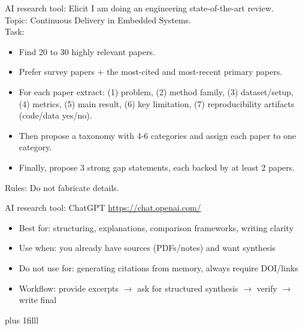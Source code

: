 \documentclass[aspectratio=169]{beamer}
\newcommand{\btVFill}{\vskip0pt plus 1filll}
\begin{document}
\begin{frame}{AI research tool: Elicit}
I am doing an engineering state-of-the-art review.\\
Topic: Continuous Delivery in Embedded Systems.\\
Task:
\begin{itemize}
 \item Find 20 to 30 highly relevant papers.
 \item  Prefer survey papers + the most-cited and most-recent primary papers.
 \item For each paper extract: (1) problem, (2) method family, (3) dataset/setup, (4) metrics,
  (5) main result, (6) key limitation, (7) reproducibility artifacts (code/data yes/no).
 \item Then propose a taxonomy with 4-6 categories and assign each paper to one category.
 \item Finally, propose 3 strong gap statements, each backed by at least 2 papers. 
\end{itemize}
Rules: Do not fabricate details.
\end{frame}

\begin{frame}{AI research tool: ChatGPT}
  \url{https://chat.openai.com/}
\begin{itemize}
  \item Best for: structuring, explanations, comparison frameworks, writing clarity
  \item Use when: you already have sources (PDFs/notes) and want synthesis 
  \item Do not use for: generating citations from memory,  always require DOI/links
  \item Workflow: provide excerpts $\rightarrow$ ask for structured synthesis $\rightarrow$ verify $\rightarrow$ write final
\end{itemize}
\btVFill\end{frame}
\end{document}
